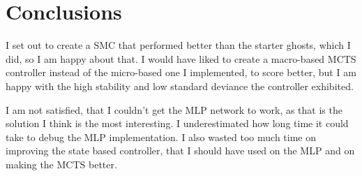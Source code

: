 \documentclass[conference]{IEEEtran}
\begin{document}
\section{Conclusions}

I set out to create a SMC that performed better than the starter ghosts, which I did, so I am happy about that.
I would have liked to create a macro-based MCTS controller instead of the micro-based one I implemented, to score better, but I am happy with the high stability and low standard deviance the controller exhibited.

I am not satisfied, that I couldn't get the MLP network to work, as that is the solution I think is the most interesting. I underestimated how long time it could take to debug the MLP implementation. I also wasted too much time on improving the state based controller, that I should have used on the MLP and on making the MCTS better.


%
%
%
%

\end{document}
